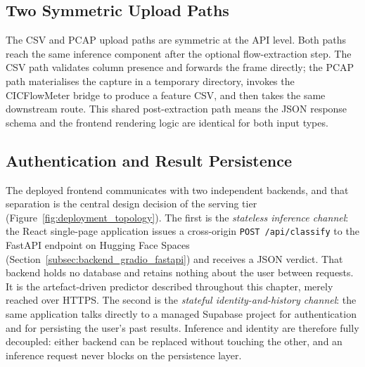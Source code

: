 \subsection{Two Symmetric Upload Paths}
\label{subsec:two_tabs}

\par The CSV and PCAP upload paths are symmetric at the API level. Both paths reach the same inference component after the optional flow-extraction step. The CSV path validates column presence and forwards the frame directly; the PCAP path materialises the capture in a temporary directory, invokes the CICFlowMeter bridge to produce a feature CSV, and then takes the same downstream route. This shared post-extraction path means the JSON response schema and the frontend rendering logic are identical for both input types.

\subsection{Authentication and Result Persistence}
\label{subsec:auth_persistence}

\par The deployed frontend communicates with two independent backends, and that separation is the central design decision of the serving tier (Figure~\ref{fig:deployment_topology}). The first is the \emph{stateless inference channel}: the React single-page application issues a cross-origin \texttt{POST /api/classify} to the FastAPI endpoint on Hugging Face Spaces (Section~\ref{subsec:backend_gradio_fastapi}) and receives a JSON verdict. That backend holds no database and retains nothing about the user between requests. It is the artefact-driven predictor described throughout this chapter, merely reached over HTTPS. The second is the \emph{stateful identity-and-history channel}: the same application talks directly to a managed Supabase project for authentication and for persisting the user's past results. Inference and identity are therefore fully decoupled: either backend can be replaced without touching the other, and an inference request never blocks on the persistence layer.

